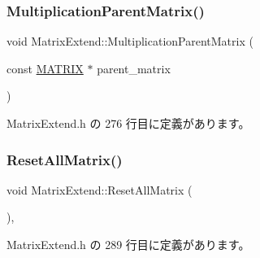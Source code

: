 \subsubsection{\texorpdfstring{Multiplication\+Parent\+Matrix()}{MultiplicationParentMatrix()}}
{\footnotesize\ttfamily void Matrix\+Extend\+::\+Multiplication\+Parent\+Matrix (\begin{DoxyParamCaption}\item[{const \mbox{\hyperlink{_vector3_d_8h_a032295cd9fb1b711757c90667278e744}{M\+A\+T\+R\+IX}} $\ast$}]{parent\+\_\+matrix }\end{DoxyParamCaption})\hspace{0.3cm}{\ttfamily [inline]}}



 Matrix\+Extend.\+h の 276 行目に定義があります。

\mbox{\label{class_matrix_extend_a81db064716c74390d9c4b7e1022a4b27}} 
\subsubsection{\texorpdfstring{Reset\+All\+Matrix()}{ResetAllMatrix()}}
{\footnotesize\ttfamily void Matrix\+Extend\+::\+Reset\+All\+Matrix (\begin{DoxyParamCaption}{ }\end{DoxyParamCaption})\hspace{0.3cm}{\ttfamily [inline]}, {\ttfamily [private]}}



 Matrix\+Extend.\+h の 289 行目に定義があります。

